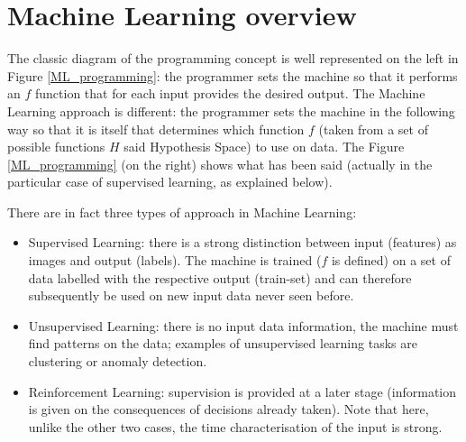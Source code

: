 \begin{table}
	\centering
	\caption{Categories of the Effect On Flight (EOF) provoked by wildlife strike events.}
	\label{tab-EOF}
\end{table}

\section{Machine Learning overview}
The classic diagram of the programming concept is well represented on the left in Figure \ref{ML_programming}: the programmer sets the machine so that it performs an $f$ function that for each input provides the desired output.
The Machine Learning approach is different: the programmer sets the machine in the following way so that it is itself that determines which function $f$ (taken from a set of possible functions $H$ said Hypothesis Space) to use on data. The Figure  \ref{ML_programming} (on the right) shows what has been said (actually in the particular case of supervised learning, as explained below).

There are in fact three types of approach in Machine Learning:

\begin{itemize}
\item Supervised Learning: there is a strong distinction between input (features) as images and output (labels). The machine is trained ($f$ is defined) on a set of data labelled with the respective output (train-set) and can therefore subsequently be used on new input data never seen before.

\item Unsupervised Learning: there is no input data information, the machine must find patterns on the data; examples of unsupervised learning tasks are clustering or anomaly detection.

\item Reinforcement Learning: supervision is provided at a later stage (information is given on the consequences of decisions already taken). Note that here, unlike the other two cases, the time characterisation of the input is strong.
\end{itemize}

